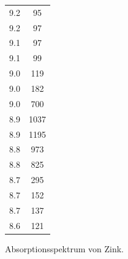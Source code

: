 \begin{figure}
{\begin{tabular}{c c}
    9.2 & 95 \\
    9.2 & 97 \\
    9.1 & 97 \\
    9.1 & 99 \\
    9.0 & 119 \\
    9.0 & 182 \\
    9.0 & 700 \\
    8.9 & 1037 \\
    8.9 & 1195 \\
    8.8 & 973 \\
    8.8 & 825 \\
    8.7 & 295 \\
    8.7 & 152 \\
    8.7 & 137 \\
    8.6 & 121 \\
    \bottomrule
  \end{tabular}
  }
  \caption{Absorptionsspektrum von Zink.}
  \label{fig:6}
\end{figure}


